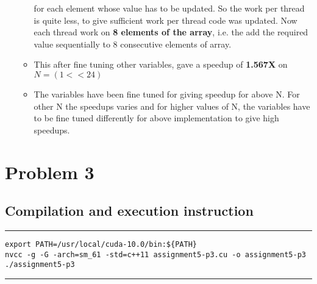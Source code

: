 \documentclass[a4paper]{article}
\begin{document}
\begin{enumerate}
\begin{itemize}
	for each element whose value has to be updated. So the work per thread is quite less, to give sufficient work
	per thread code was updated. Now each thread work on {\bf 8 elements of the array}, i.e. the add the
	required value sequentially to 8 consecutive elements of array.
	\item This after fine tuning other variables, gave a speedup of {\bf 1.567X} on {\bf $N = (1 << 24)$} 
	\item The variables have been fine tuned for giving speedup for above N. For other N the speedups varies
	and for higher values of N, the variables have to be fine tuned differently for above implementation to give
	high speedups.
	\end{itemize}
\end{enumerate}


\newpage

\section{\Huge Problem 3}
\vspace{0.5cm}
\subsection{Compilation and execution instruction }
\vspace{0.3cm}
\hrule
\begin{lstlisting}
export PATH=/usr/local/cuda-10.0/bin:${PATH}
nvcc -g -G -arch=sm_61 -std=c++11 assignment5-p3.cu -o assignment5-p3
./assignment5-p3
\end{lstlisting}
\hrule 
\vspace{0.5cm}
\end{document}
